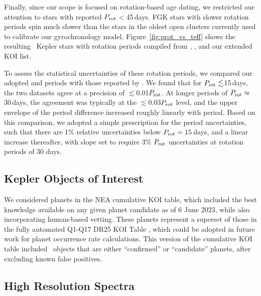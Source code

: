 \documentclass[11pt,twocolumn,tighten]{aastex63}
\begin{document}
Finally, since our scope is focused on rotation-based age dating, we
restricted our attention to stars with reported $P_{\rm
rot}$$<$45\,days.  FGK stars with slower rotation periods spin much
slower than the stars in the oldest open clusters currently used to
calibrate our gyrochronology model.  Figure~\ref{fig:prot_vs_teff}
shows the resulting \nuniqstarsantosrot\ Kepler stars with rotation
periods compiled from ,
, and our extended KOI list.

To assess the statistical uncertainties of these rotation periods, we
compared our adopted  and
 periods with those reported by
\citet{McQuillan_2014}.  We found that for $P_{\rm
rot}\lesssim$15\,days, the two datasets agree at a precision of
$\lesssim$0.01$P_{\rm rot}$.  At longer periods of $P_{\rm
rot}\approx$30\,days, the agreement was typically at the
$\lesssim$0.03$P_{\rm rot}$ level, and the upper envelope of the
period difference increased roughly linearly with period.  Based on
this comparison, we adopted a simple prescription for the period
uncertainties, such that there are 1\% relative uncertainties below
$P_{\rm rot}=15$\,days, and a linear increase thereafter, with slope
set to require 3\% $P_{\rm rot}$ uncertainties at rotation periods of
30 days.







\subsection{Kepler Objects of Interest}
\label{subsec:planetsel}

We considered planets in the NEA cumulative KOI table, which included
the best knowledge available on any given planet candidate as of 6
June 2023, while also incorporating human-based vetting.  These
planets represent a superset of those in the fully automated Q1-Q17
DR25 KOI Table \citep{Thompson_2018}, which could be adopted in future
work for planet occurrence rate calculations.  This version of the
cumulative KOI table included \nkoisnofp\ objects that are either
``confirmed'' or ``candidate'' planets, after excluding known false
positives. 

\subsection{High Resolution Spectra}
\label{subsec:lithiumsel}
\end{document}
